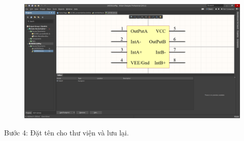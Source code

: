         \begin{figure}[H]
            \centering
            \includegraphics[width=1\textwidth]{pictures/ch3.3.png}
        \end{figure}
        Bước 4: Đặt tên cho thư viện và lưu lại.\\
